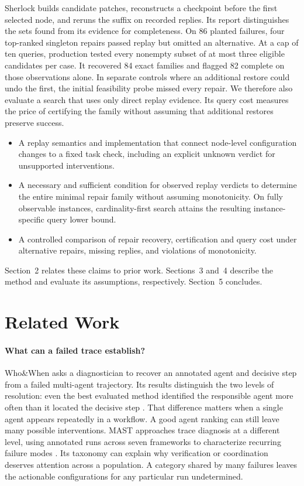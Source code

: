 \documentclass[11pt,letterpaper]{article}
\begin{document}
Sherlock builds candidate patches, reconstructs a checkpoint before the first selected node, and reruns the suffix on recorded replies. Its report distinguishes the sets found from its evidence for completeness. On 86 planted failures, four top-ranked singleton repairs passed replay but omitted an alternative. At a cap of ten queries, production tested every nonempty subset of at most three eligible candidates per case. It recovered 84 exact families and flagged 82 complete on those observations alone. In separate controls where an additional restore could undo the first, the initial feasibility probe missed every repair. We therefore also evaluate a search that uses only direct replay evidence. Its query cost measures the price of certifying the family without assuming that additional restores preserve success.

\begin{itemize}
\item A replay semantics and implementation that connect node-level configuration changes to a fixed task check, including an explicit unknown verdict for unsupported interventions.
\item A necessary and sufficient condition for observed replay verdicts to determine the entire minimal repair family without assuming monotonicity. On fully observable instances, cardinality-first search attains the resulting instance-specific query lower bound.
\item A controlled comparison of repair recovery, certification and query cost under alternative repairs, missing replies, and violations of monotonicity.
\end{itemize}
Section~2 relates these claims to prior work. Sections~3 and~4 describe the method and evaluate its assumptions, respectively. Section~5 concludes.

\section{Related Work}
\paragraph{What can a failed trace establish?}
Who\&When asks a diagnostician to recover an annotated agent and decisive step from a failed multi-agent trajectory. Its results distinguish the two levels of resolution: even the best evaluated method identified the responsible agent more often than it located the decisive step \cite{zhang}. That difference matters when a single agent appears repeatedly in a workflow. A good agent ranking can still leave many possible interventions. MAST approaches trace diagnosis at a different level, using annotated runs across seven frameworks to characterize recurring failure modes \cite{cemri}. Its taxonomy can explain why verification or coordination deserves attention across a population. A category shared by many failures leaves the actionable configurations for any particular run undetermined.
\end{document}
